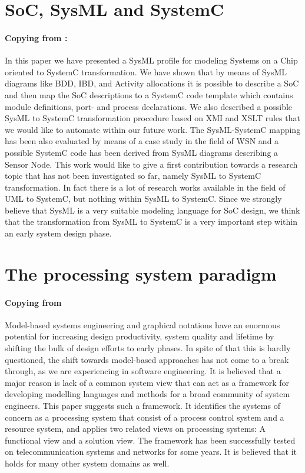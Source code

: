 \documentclass[a4paper,12pt,twoside]{report}
\begin{document}
{		\section{SoC, SysML and SystemC}
			\paragraph{Copying from \cite{SoCSysMLSystemC} : } {In this paper we have presented a SysML profile for modeling Systems on a Chip oriented to SystemC transformation. We have shown that by means of SysML diagrams like BDD, IBD, and Activity allocations it is possible to describe a SoC and then map the SoC descriptions to a SystemC code template which contains module definitions, port- and process declarations. We also described a possible SysML to SystemC transformation procedure based on XMI and XSLT rules that we would like to automate within our future work. The SysML-SystemC mapping has been also evaluated by means of a case study in the field of WSN and a possible SystemC code has been derived from SysML diagrams describing a Sensor Node. This work would like to give a first contribution towards a research topic that has not been investigated so far, namely SysML to SystemC transformation. In fact there is a lot of research works available in the field of UML to SystemC, but nothing within SysML to SystemC. Since we strongly believe that SysML is a very suitable modeling language for SoC design, we think that the transformation from SysML to SystemC is a very important step within an early system design phase.
			}

		\section{The processing system paradigm}
			\paragraph{Copying from \cite{ProcessingSysPar}} {Model-based systems engineering and graphical notations have an enormous potential for increasing design productivity, system quality and lifetime by shifting the bulk of design efforts to early phases. In spite of that this is hardly questioned, the shift towards model-based approaches has not come to a break through, as we are experiencing in software engineering. It is believed that a major reason is lack of a common system view that can act as a framework for developing modelling languages and methods for a broad community of system engineers. This paper suggests such a framework. It identifies the systems of concern as a processing system that consist of a process control system and a resource system, and applies two related views on processing systems: A functional view and a solution view. The framework has been successfully tested on telecommunication systems and networks for some years. It is believed that it holds for many other system domains as well.
			}
			
}
\end{document}
